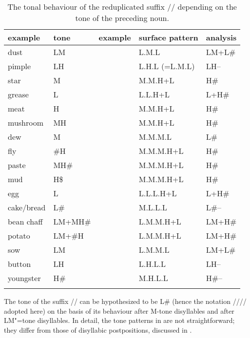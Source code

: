 \begin{table}%
	\caption{\label{tab:thetonalbehaviourofthereduplicatedsuffixdependingonthetoneoftheprecedingnoun}The tonal behaviour of the reduplicated suffix // depending on the tone of the preceding noun.}
	\begin{tabularx}{\textwidth}{ Q l l l Q }
		\lsptoprule
		example & tone & example & surface pattern & analysis\\ \midrule
		dust & LM &  & L.M.L & LM+L\#\\
		pimple & LH &  & L.H.L (=L.M.L) & LH--\\
		star & M &  & M.M.H+L & H\#\\
		grease & L &  & L.L.H+L & L+H\#\\
		meat & H &  & M.M.H+L & H\#\\
		mushroom & MH &  & M.M.H+L & H\#\\ \addlinespace \hdashline \addlinespace
		dew & M &  & M.M.M.L & L\#\\
		fly & \#H &  & M.M.M.H+L & H\#\\
		paste & MH\# &  & M.M.M.H+L & H\#\\
		mud & H\$ &  & M.M.M.H+L & H\#\\
		egg & L &  & L.L.L.H+L & L+H\#\\
		cake/bread & L\# &  & M.L.L.L & L\#--\\
		bean chaff & LM+MH\# &  & L.M.M.H+L & LM+H\#\\
		potato & LM+\#H &  & L.M.M.H+L & LM+H\#\\
		sow & LM &  & L.M.M.L & LM+L\#\\
		button & LH &  & L.H.L.L & LH--\\
		youngster & H\# &  & M.H.L.L & H\#--\\
		\lspbottomrule
	\end{tabularx}
\end{table}

The tone of the suffix // can be hypothesized to be L\# (hence the notation
//// adopted here) on the basis of its behaviour after M-tone disyllables and
after LM"=tone disyllables. In detail, the tone patterns in  are not straightforward; they differ from
those of disyllabic postpositions, discussed in .


